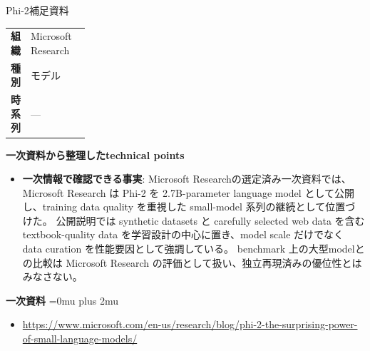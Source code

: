 \begin{technicalnote}{Phi-2}{補足資料}
\begingroup
\begin{tabularx}{\linewidth}{@{}>{\bfseries}p{0.22\linewidth}X@{}}
組織 & Microsoft Research \\
種別 & モデル \\
時系列 & — \\
\end{tabularx}
\smallskip
{\bfseries 一次資料から整理したtechnical points}
\begin{itemize}[leftmargin=1.5em,itemsep=0.35em]
\item \textbf{一次情報で確認できる事実}: Microsoft Researchの選定済み一次資料では、Microsoft Research は Phi-2 を 2.7B-parameter language model として公開し、training data quality を重視した small-model 系列の継続として位置づけた。 公開説明では synthetic datasets と carefully selected web data を含む textbook-quality data を学習設計の中心に置き、model scale だけでなく data curation を性能要因として強調している。 benchmark 上の大型modelとの比較は Microsoft Research の評価として扱い、独立再現済みの優位性とはみなさない。
\end{itemize}
\begin{minipage}{\linewidth}
\begin{samepage}
{\bfseries 一次資料}
\begingroup\sloppy
\Urlmuskip=0mu plus 2mu\relax
\begin{itemize}[leftmargin=1.5em,itemsep=0.25em]
\item {\scriptsize\url{https://www.microsoft.com/en-us/research/blog/phi-2-the-surprising-power-of-small-language-models/}}
\end{itemize}
\endgroup
\end{samepage}
\end{minipage}
\endgroup
\end{technicalnote}
\medskip
